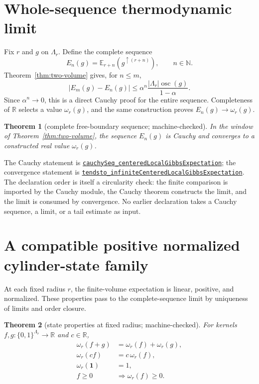 \documentclass[11pt]{article}
\newtheorem{theorem}{Theorem}[section]
\theoremstyle{definition}
\newcommand{\R}{\mathbb R}
\newcommand{\N}{\mathbb N}
\newcommand{\E}{\mathbb E}
\newcommand{\osc}{\operatorname{osc}}
\newcommand{\one}{\mathbf 1}
\newcommand{\abs}[1]{\lvert #1\rvert}
\newcommand{\sourceanchor}{f587b35001f4ae87c7fe0383662864df6bc9a1c0}
\newcommand{\leanline}[3]{%
  \href{https://github.com/lluiseriksson/THE-ERIKSSON-PROGRAMME/blob/\sourceanchor/YangMills/OS/#1.lean\#L#2}{\nolinkurl{#3}}}
\begin{document}
\section{Whole-sequence thermodynamic limit}

Fix $r$ and $g$ on $\Lambda_r$.  Define the complete sequence
\[
  E_n(g)=\E_{r+n}(g^{\uparrow(r+n)}),\qquad n\in\N.
\]
Theorem~\ref{thm:two-volume} gives, for $n\le m$,
\[
  \abs{E_m(g)-E_n(g)}
  \le
  \alpha^n\frac{\abs{\Lambda_r}\osc(g)}{1-\alpha}.
\]
Since $\alpha^n\to0$, this is a direct Cauchy proof for the entire sequence.
Completeness of $\R$ selects a value $\omega_r(g)$, and the same construction
proves $E_n(g)\to\omega_r(g)$.

\begin{theorem}[complete free-boundary sequence; machine-checked]
\label{thm:limit}
In the window of Theorem~\ref{thm:two-volume}, the sequence $E_n(g)$ is Cauchy
and converges to a constructed real value $\omega_r(g)$.
\end{theorem}

The Cauchy statement is
\leanline{DobrushinThermodynamicLimit}{64}{cauchySeq_centeredLocalGibbsExpectation};
the convergence statement is
\leanline{DobrushinThermodynamicLimit}{98}{tendsto_infiniteCenteredLocalGibbsExpectation}.
The declaration order is itself a circularity check: the finite comparison is
imported by the Cauchy module, the Cauchy theorem constructs the limit, and the
limit is consumed by convergence.  No earlier declaration takes a Cauchy
sequence, a limit, or a tail estimate as input.

\section{A compatible positive normalized cylinder-state family}
\label{sec:state}

At each fixed radius $r$, the finite-volume expectation is linear, positive,
and normalized.  These properties pass to the complete-sequence limit by
uniqueness of limits and order closure.

\begin{theorem}[state properties at fixed radius; machine-checked]
For kernels $f,g:\{0,1\}^{\Lambda_r}\to\R$ and $c\in\R$,
\begin{align*}
  \omega_r(f+g)&=\omega_r(f)+\omega_r(g),\\
  \omega_r(cf)&=c\,\omega_r(f),\\
  \omega_r(\one)&=1,\\
  f\ge0&\Longrightarrow\omega_r(f)\ge0.
\end{align*}
\end{theorem}
\end{document}
